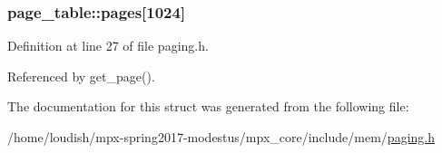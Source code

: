 \subsubsection[{\texorpdfstring{pages}{pages}}]{ page\+\_\+table\+::pages\mbox{[}1024\mbox{]}}\hypertarget{structpage__table_aa066e0fa847ce2fafb6a2feddfa340ff}{}\label{structpage__table_aa066e0fa847ce2fafb6a2feddfa340ff}


Definition at line 27 of file paging.\+h.



Referenced by get\+\_\+page().



The documentation for this struct was generated from the following file\+:\begin{DoxyCompactItemize}
\item 
/home/loudish/mpx-\/spring2017-\/modestus/mpx\+\_\+core/include/mem/\hyperlink{paging_8h}{paging.\+h}\end{DoxyCompactItemize}
